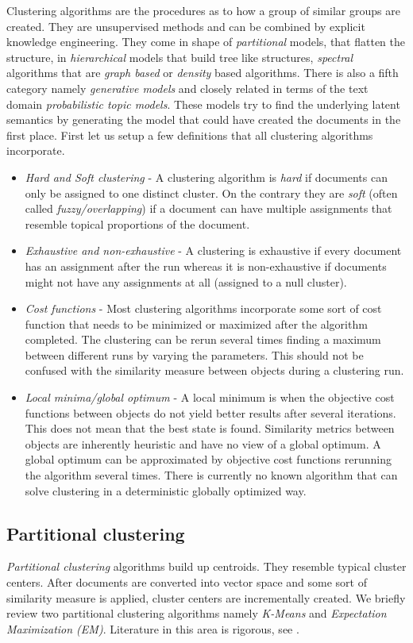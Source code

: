   Clustering algorithms are the procedures as to how a group of similar groups are created. They are unsupervised methods and can be combined by explicit knowledge engineering. They come in shape of \emph{partitional} models, that flatten the structure, in \emph{hierarchical} models that build tree like structures, \emph{spectral} algorithms that are \emph{graph based} or \emph{density} based algorithms. There is also a fifth category namely \emph{generative models} and closely related in terms of the text domain \emph{probabilistic topic models}. These models try to find the underlying latent semantics by generating the model that could have created the documents in the first place. First let us setup a few definitions that all clustering algorithms incorporate.

  \begin{itemize}
    \item \emph{Hard and Soft clustering} - A clustering algorithm is \emph{hard} if documents can only be assigned to one distinct cluster. On the contrary they are \emph{soft} (often called \emph{fuzzy/overlapping}) if a document can have multiple assignments that resemble topical proportions of the document.
    \item \emph{Exhaustive and non-exhaustive} - A clustering is exhaustive if every document has an assignment after the run whereas it is non-exhaustive if documents might not have any assignments at all (assigned to a null cluster).
    \item \emph{Cost functions} - Most clustering algorithms incorporate some sort of cost function that needs to be minimized or maximized after the algorithm completed. The clustering can be rerun several times finding a maximum between different runs by varying the parameters. This should not be confused with the similarity measure between objects during a clustering run.
    \item \emph{Local minima/global optimum} - A local minimum is when the objective cost functions between objects do not yield better results after several iterations. This does not mean that the best state is found. Similarity metrics between objects are inherently heuristic and have no view of a global optimum. A global optimum can be approximated by objective cost functions rerunning the algorithm several times. There is currently no known algorithm that can solve clustering in a deterministic globally optimized way.
  \end{itemize}

  \subsection{Partitional clustering}
    \emph{Partitional clustering} algorithms build up centroids. They resemble typical cluster centers. After documents are converted into vector space and some sort of similarity measure is applied, cluster centers are incrementally created. We briefly review two partitional clustering algorithms namely \emph{K-Means} and \emph{Expectation Maximization (EM)}. Literature in this area is rigorous, see \cite{ClusteringBooAggarwalk2013, NextFrontierClustering2013, IRBookStanford2008}.

